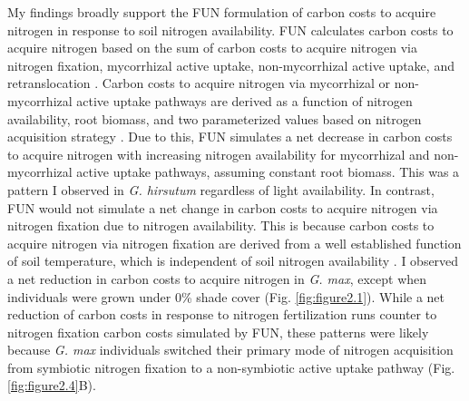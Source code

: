 My findings broadly support the FUN formulation of carbon costs to acquire nitrogen in response to soil nitrogen availability. FUN calculates carbon costs to acquire nitrogen based on the sum of carbon costs to acquire nitrogen via nitrogen fixation, mycorrhizal active uptake, non-mycorrhizal active uptake, and retranslocation . Carbon costs to acquire nitrogen via mycorrhizal or non-mycorrhizal active uptake pathways are derived as a function of nitrogen availability, root biomass, and two parameterized values based on nitrogen acquisition strategy . Due to this, FUN simulates a net decrease in carbon costs to acquire nitrogen with increasing nitrogen availability for mycorrhizal and non-mycorrhizal active uptake pathways, assuming constant root biomass. This was a pattern I observed in \textit{G. hirsutum} regardless of light availability. In contrast, FUN would not simulate a net change in carbon costs to acquire nitrogen via nitrogen fixation due to nitrogen availability. This is because carbon costs to acquire nitrogen via nitrogen fixation are derived from a well established function of soil temperature, which is independent of soil nitrogen availability . I observed a net reduction in carbon costs to acquire nitrogen in \textit{G. max}, except when individuals were grown under 0\% shade cover (Fig. \ref{fig:figure2.1}). While a net reduction of carbon costs in response to nitrogen fertilization runs counter to nitrogen fixation carbon costs simulated by FUN, these patterns were likely because \textit{G. max} individuals switched their primary mode of nitrogen acquisition from symbiotic nitrogen fixation to a non-symbiotic active uptake pathway (Fig. \ref{fig:figure2.4}B).

